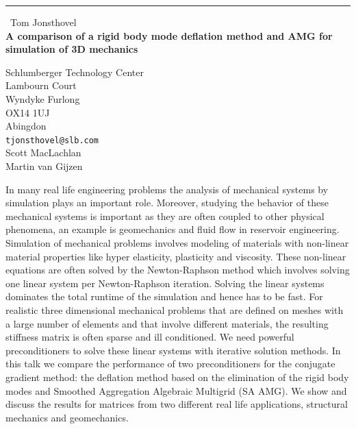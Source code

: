 \documentclass{report}
\begin{document}
\begin{center}
\rule{6in}{1pt} \
{\large Tom Jonsthovel \\
{\bf A comparison of a rigid body mode deflation method and AMG for simulation of 3D mechanics}}

Schlumberger Technology Center \\ Lambourn Court \\ Wyndyke Furlong \\ OX14 1UJ \\ Abingdon
\\
{\tt tjonsthovel@slb.com}\\
Scott MacLachlan\\
Martin van Gijzen\end{center}

In many real life engineering problems the analysis of mechanical systems
by simulation plays an important role. Moreover, studying the behavior of
these mechanical systems is important as they are often coupled to other
physical phenomena, an example is geomechanics and fluid flow in
reservoir engineering. Simulation of mechanical problems involves
modeling of materials with non-linear material properties like hyper
elasticity, plasticity and viscosity. These non-linear equations are
often solved by the Newton-Raphson method which involves solving one
linear system per Newton-Raphson iteration. Solving the linear systems
dominates the total runtime of the simulation and hence has to be fast.
For realistic three dimensional mechanical problems that are defined on
meshes with a large number of elements and that involve different
materials, the resulting stiffness matrix is often sparse and ill
conditioned. We need powerful preconditioners to solve these linear
systems with iterative solution methods. In this talk we compare the
performance of two preconditioners for the conjugate gradient method: the
deflation method based on the elimination of the rigid body modes and
Smoothed Aggregation Algebraic Multigrid (SA AMG). We show and discuss
the results for matrices from two different real life applications,
structural mechanics and geomechanics.
\end{document}
